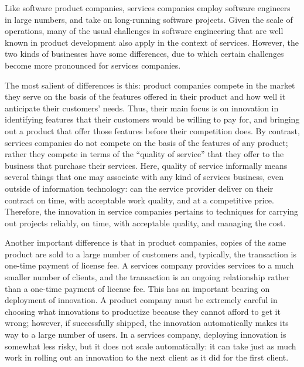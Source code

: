 Like software product companies, services companies employ software engineers in
large numbers, and take on long-running software projects. Given the scale of
operations, many of the usual challenges in software engineering that are well
known in product development also apply in the context of services.  However,
the two kinds of businesses have some differences, due to which certain
challenges become more pronounced for services companies.

The most salient of differences is this: product companies compete in the market
they serve on the basis of the features offered in their product and how well it
anticipate their customers' needs. Thus, their main focus is on innovation in
identifying features that their customers would be willing to pay for, and
bringing out a product that offer those features before their competition
does. By contrast, services companies do not compete on the basis of the
features of any product; rather they compete in terms of the ``quality of
service'' that they offer to the business that purchase their services. Here,
quality of service informally means several things that one may associate with
any kind of services business, even outside of information technology: can the
service provider deliver on their contract on time, with acceptable work
quality, and at a competitive price.  Therefore, the innovation in service
companies pertains to techniques for carrying out projects reliably, on time,
with acceptable quality, and managing the cost.

Another important difference is that in product companies, copies of the same
product are sold to a large number of customers and, typically, the transaction
is one-time payment of license fee.  A services company provides services to a
much smaller number of clients, and the transaction is an ongoing relationship
rather than a one-time payment of license fee. This has an important bearing on
deployment of innovation.  A product company must be extremely careful in
choosing what innovations to productize because they cannot afford to get it
wrong; however, if successfully shipped, the innovation automatically makes its
way to a large number of users.  In a services company, deploying innovation is
somewhat less risky, but it does not scale automatically: it can take just as
much work in rolling out an innovation to the next client as it did for the
first client.


